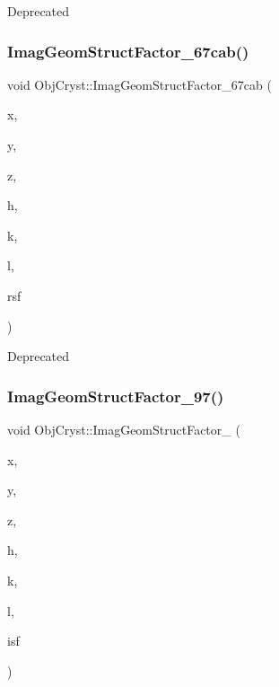 \begin{DoxyRefDesc}{Deprecated}
\item[\mbox{\hyperlink{deprecated__deprecated000021}{Deprecated}}]\end{DoxyRefDesc}
\mbox{\label{namespace_obj_cryst_acdc196b114308b48ca273817f04da705}} 
\subsubsection{\texorpdfstring{ImagGeomStructFactor\_67cab()}{ImagGeomStructFactor\_67cab()}}
{\footnotesize\ttfamily void Obj\+Cryst\+::\+Imag\+Geom\+Struct\+Factor\+\_\+67cab (\begin{DoxyParamCaption}\item[{const R\+E\+AL}]{x,  }\item[{const R\+E\+AL}]{y,  }\item[{const R\+E\+AL}]{z,  }\item[{const Cryst\+Vector\+\_\+\+R\+E\+AL \&}]{h,  }\item[{const Cryst\+Vector\+\_\+\+R\+E\+AL \&}]{k,  }\item[{const Cryst\+Vector\+\_\+\+R\+E\+AL \&}]{l,  }\item[{Cryst\+Vector\+\_\+\+R\+E\+AL \&}]{rsf }\end{DoxyParamCaption})}

\begin{DoxyRefDesc}{Deprecated}
\item[\mbox{\hyperlink{deprecated__deprecated000019}{Deprecated}}]\end{DoxyRefDesc}
\mbox{\label{namespace_obj_cryst_a1ba7e310cee99bb6d2463ab8f73d3357}} 
\subsubsection{\texorpdfstring{ImagGeomStructFactor\_97()}{ImagGeomStructFactor\_97()}}
{\footnotesize\ttfamily void Obj\+Cryst\+::\+Imag\+Geom\+Struct\+Factor\+\_ (\begin{DoxyParamCaption}\item[{const R\+E\+AL}]{x,  }\item[{const R\+E\+AL}]{y,  }\item[{const R\+E\+AL}]{z,  }\item[{const Cryst\+Vector\+\_\+\+R\+E\+AL \&}]{h,  }\item[{const Cryst\+Vector\+\_\+\+R\+E\+AL \&}]{k,  }\item[{const Cryst\+Vector\+\_\+\+R\+E\+AL \&}]{l,  }\item[{Cryst\+Vector\+\_\+\+R\+E\+AL \&}]{isf }\end{DoxyParamCaption})}

